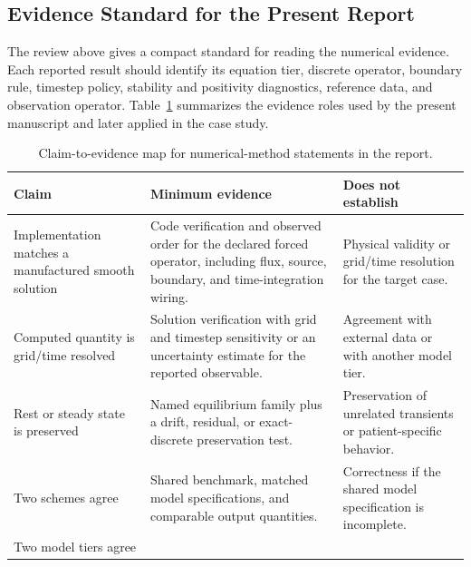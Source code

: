 \subsection{Evidence Standard for the Present Report}
\label{subsec:numerical-methods-evidence-standards}

The review above gives a compact standard for reading the numerical evidence.
Each reported result should identify its equation tier, discrete operator,
boundary rule, timestep policy, stability and positivity diagnostics, reference
data, and observation operator. Table~\ref{tab:numerical-methods-evidence-map}
summarizes the evidence roles used by the present manuscript and later applied
in the case study.

\begin{table}[!htb]
    \centering
    \scriptsize
    \caption{Claim-to-evidence map for numerical-method statements in the
    report.}
    \label{tab:numerical-methods-evidence-map}
    \begin{tabularx}{\textwidth}{@{}
        >{\raggedright\arraybackslash}p{}
        >{\raggedright\arraybackslash}p{}
        >{\raggedright\arraybackslash}X@{}}
        \toprule
        \textbf{Claim} & \textbf{Minimum evidence} & \textbf{Does not establish} \\
        \midrule
        Implementation matches a manufactured smooth solution
            & Code verification and observed order for the declared forced
            operator, including flux, source, boundary, and time-integration
            wiring.
            & Physical validity or grid/time resolution for the target case. \\
        Computed quantity is grid/time resolved
            & Solution verification with grid and timestep sensitivity or an
            uncertainty estimate for the reported observable.
            & Agreement with external data or with another model tier. \\
        Rest or steady state is preserved
            & Named equilibrium family plus a drift, residual, or exact-discrete
            preservation test.
            & Preservation of unrelated transients or patient-specific behavior. \\
        Two schemes agree
            & Shared benchmark, matched model specifications, and comparable
            output
            quantities.
            & Correctness if the shared model specification is incomplete. \\
        Two model tiers agree

\end{tabularx}
\end{table}
